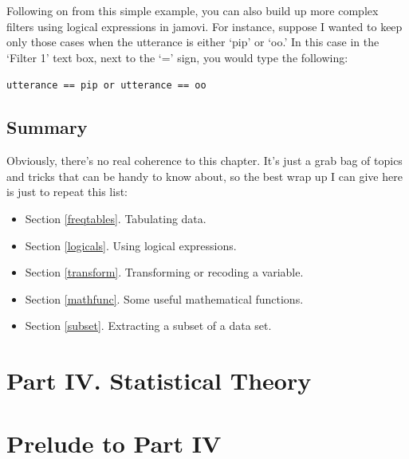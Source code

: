 \documentclass[
]{book}
\providecommand{\tightlist}{%
  \setlength{\itemsep}{0pt}\setlength{\parskip}{0pt}}
\begin{document}
Following on from this simple example, you can also build up more complex filters using logical expressions in jamovi. For instance, suppose I wanted to keep only those cases when the utterance is either `pip' or `oo.' In this case in the `Filter 1' text box, next to the `=' sign, you would type the following:

\texttt{utterance\ ==\ \textquotesingle{}pip\textquotesingle{}\ or\ utterance\ ==\ \textquotesingle{}oo\textquotesingle{}}

\hypertarget{summary-3}{%
\section{Summary}\label{summary-3}}

Obviously, there's no real coherence to this chapter. It's just a grab bag of topics and tricks that can be handy to know about, so the best wrap up I can give here is just to repeat this list:

\begin{itemize}
\tightlist
\item
  Section \ref{freqtables}. Tabulating data.
\item
  Section \ref{logicals}. Using logical expressions.
\item
  Section \ref{transform}. Transforming or recoding a variable.
\item
  Section \ref{mathfunc}. Some useful mathematical functions.
\item
  Section \ref{subset}. Extracting a subset of a data set.
\end{itemize}

\hypertarget{part-iv.-statistical-theory}{%
\chapter*{Part IV. Statistical Theory}\label{part-iv.-statistical-theory}}

\hypertarget{prelude-to-part-iv}{%
\chapter*{Prelude to Part IV}\label{prelude-to-part-iv}}
\end{document}
